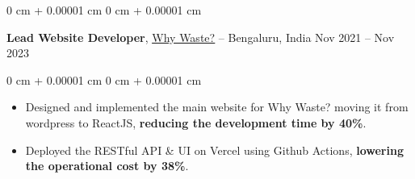 \documentclass[10pt, a4paper]{article}
\newenvironment{highlights}{
    \begin{itemize}[
        topsep=0 cm,
        parsep=0 cm,
        partopsep=0pt,
        itemsep=0pt,
        leftmargin=0 cm + 10pt
    ]
}{
    \end{itemize}
} %
\newenvironment{onecolentry}{
    \begin{adjustwidth}{
        0 cm + 0.00001 cm
    }{
        0 cm + 0.00001 cm
    }
}{
    \end{adjustwidth}
} %
\newenvironment{twocolentry}[2][]{
    \onecolentry
    \def\secondColumn{#2}
    \setcolumnwidth{\fill, 6.0 cm}
    \begin{paracol}{2}
}{
    \switchcolumn \raggedleft \secondColumn
    \end{paracol}
    \endonecolentry
} %
\begin{document}
        \vspace{0.10 cm}

        \begin{twocolentry}{
            Nov 2021 – Nov 2023
        }
            \textbf{Lead Website Developer}, \href{https://www.whywaste.io/}{\underline{Why Waste?}} -- Bengaluru, India\end{twocolentry}

        \vspace{0.10 cm}
        \begin{onecolentry}
            \begin{highlights}
                \item Designed and implemented the main website for Why Waste? moving it from wordpress to ReactJS, \textbf{reducing the development time by 40\%}. 
                \item Deployed the RESTful API \& UI on Vercel using Github Actions, \textbf{lowering the operational cost by 38\%}.
            \end{highlights}
        \end{onecolentry}
    

            

\end{document}
